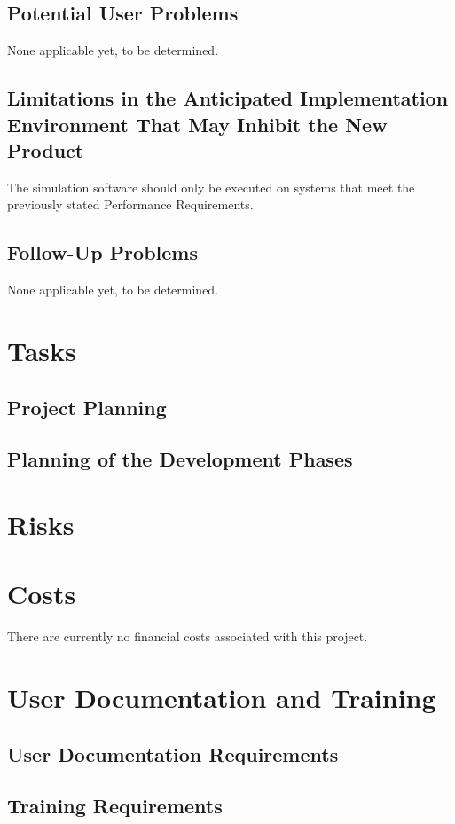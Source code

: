 \documentclass[paper=letter, fontsize=10pt]{scrartcl}
\numberwithin{equation}{section}		%
\numberwithin{figure}{section}			%
\numberwithin{table}{section}				%
\begin{document}
\subsection{Potential User Problems}
None applicable yet, to be determined.
\subsection{Limitations in the Anticipated Implementation Environment That May Inhibit the New Product}
The simulation software should only be executed on systems that meet the previously stated Performance Requirements.
\subsection{Follow-Up Problems}
None applicable yet, to be determined.

\section{Tasks}
\subsection{Project Planning}
\subsection{Planning of the Development Phases}

\section{Risks}

\section{Costs}
There are currently no financial costs associated with this project.

\section{User Documentation and Training}
\subsection{User Documentation Requirements}
\subsection{Training Requirements}
\end{document}
